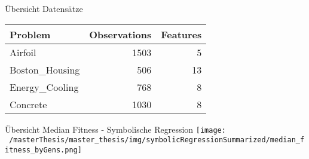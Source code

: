 \documentclass[
  ignorenonframetext,
]{beamer}
\begin{document}
\begin{frame}{Übersicht Datensätze}
\protect\hypertarget{uxfcbersicht-datensuxe4tze}{}
\begin{table}[!h]
\centering
\begin{tabular}{l|r|r}
\hline
\textbf{Problem} & \textbf{Observations} & \textbf{Features}\\
\hline
Airfoil & 1503 & 5\\
\hline
Boston\_Housing & 506 & 13\\
\hline
Energy\_Cooling & 768 & 8\\
\hline
Concrete & 1030 & 8\\
\hline
\end{tabular}
\end{table}
\end{frame}

\begin{frame}{Übersicht Median Fitness - Symbolische Regression}
\protect\hypertarget{uxfcbersicht-median-fitness---symbolische-regression}{}
\texttt{[image: ~/masterThesis/master\_thesis/img/symbolicRegressionSummarized/median\_fitness\_byGens.png]}
\end{frame}
\end{document}
